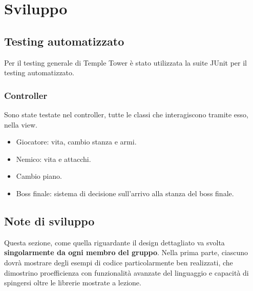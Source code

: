 \documentclass[a4paper,12pt]{report}
\begin{document}
\chapter{Sviluppo}
\section{Testing automatizzato}
Per il testing generale di Temple Tower è stato utilizzata la suite JUnit per il testing automatizzato.
\subsection*{Controller}
Sono state testate nel controller, tutte le classi che interagiscono tramite esso, nella view.

\begin{itemize}
 \item Giocatore: vita, cambio stanza e armi.
 \item Nemico: vita e attacchi.
 \item Cambio piano.
 \item Boss finale: sistema di decisione sull'arrivo alla stanza del boss finale.
\end{itemize}

\section{Note di sviluppo}

Questa sezione, come quella riguardante il design dettagliato va svolta \textbf{singolarmente da ogni membro del gruppo}.
%
Nella prima parte, ciascuno dovrà mostrare degli esempi di codice particolarmente ben realizzati,
che dimostrino proefficienza con funzionalità avanzate del linguaggio e capacità di spingersi oltre le librerie mostrate a lezione.
\end{document}
